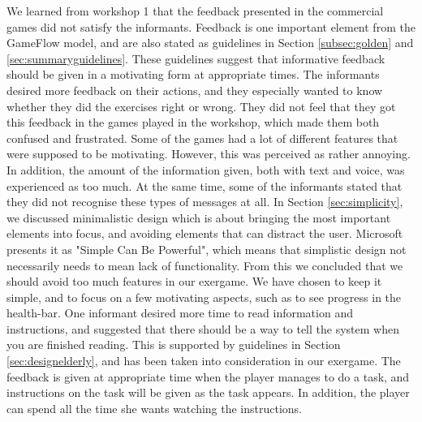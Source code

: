 We learned from workshop 1 that the feedback presented in the commercial games did not satisfy the informants. Feedback is one important element from the GameFlow model, and are also stated as guidelines in Section \ref{subsec:golden} and \ref{sec:summaryguidelines}. These guidelines suggest that informative feedback should be given in a motivating form at appropriate times. The informants desired more feedback on their actions, and they especially wanted to know whether they did the exercises right or wrong. They did not feel that they got this feedback in the games played in the workshop, which made them both confused and frustrated. Some of the games had a lot of different features that were supposed to be motivating. However, this was perceived as rather annoying. In addition, the amount of the information given, both with text and voice, was experienced as too much. At the same time, some of the informants stated that they did not recognise these types of messages at all. In Section \ref{sec:simplicity}, we discussed minimalistic design which is about bringing the most important elements into focus, and avoiding elements that can distract the user. Microsoft presents it as "Simple Can Be Powerful", which means that simplistic design not necessarily needs to mean lack of functionality. From this we concluded that we should avoid too much features in our exergame. We have chosen to keep it simple, and to focus on a few motivating aspects, such as to see progress in the health-bar. One informant desired more time to read information and instructions, and suggested that there should be a way to tell the system when you are finished reading. This is supported by guidelines in Section \ref{sec:designelderly}, and has been taken into consideration in our exergame. The feedback is given at appropriate time when the player manages to do a task, and instructions on the task will be given as the task appears. In addition, the player can spend all the time she wants watching the instructions.

